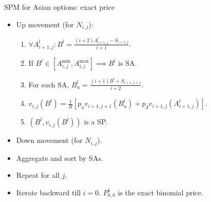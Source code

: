 \documentclass[utf8,t,compress,xcolor=svgnames,handout]{beamer}
\begin{document}
	
	\begin{frame}{SPM for Asian options: exact price}
		\begin{minipage}[t]{0.6\linewidth}
			\begin{itemize}
				\item Up movement (for $ N_{i,j} $):
				\begin{enumerate}
					\item $ \forall A_{i+1,j}^l: B^l = \frac{ ( i+2) A_{i+1,j}^l - S_{i+1,j} }{ i+1 } $.
					\item If $ B^l \in \left[ A_{i,j}^{\min}, A_{i,j}^{\max} \right]  \implies B^l $ is SA.
					\item For each SA, $ B^l_u = \frac{(i+1) B^l + S_{i+1,j+1}}{i+2} $.
					\item $ v_{i,j}( B^l ) = \frac{1}{R} \left[ p_u v_{i+1,j+1} \left( B^l_u \right) + p_d v_{i+1,j} \left( A_{i+1,j}^l \right) \right] $.
					\item $ \left( B^l, v_{i,j}( B^l ) \right) $ is a SP.
				\end{enumerate}
				\item Down movement (for $ N_{i,j} $).
				\item Aggregate and sort by SAs.
				\item Repeat for all $ j $.
				\item Iterate backward till $ i = 0 $. $ P_{0,0}^1 $ is the exact binomial price.
			\end{itemize}
			
		\end{minipage}
		\begin{minipage}[t]{0.3\linewidth}
			\begin{figure}
			\end{figure}
		\end{minipage}
	\end{frame}
	
\end{document}
